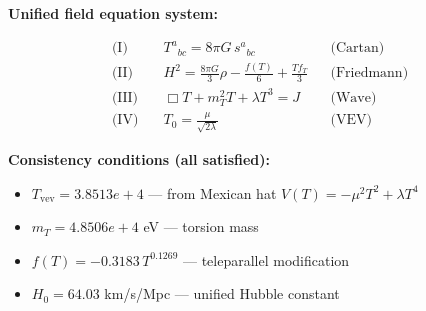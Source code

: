 
\textbf{Unified field equation system:}

\begin{align}
  \text{(I)} \quad & T^a{}_{bc} = 8\pi G \, s^a{}_{bc} && \text{(Cartan)} \\
  \text{(II)} \quad & H^2 = \frac{8\pi G}{3}\rho - \frac{f(T)}{6} + \frac{Tf_T}{3} && \text{(Friedmann)} \\
  \text{(III)} \quad & \Box T + m_T^2 T + \lambda T^3 = J && \text{(Wave)} \\
  \text{(IV)} \quad & T_0 = \frac{\mu}{\sqrt{2\lambda}} && \text{(VEV)}
\end{align}

\textbf{Consistency conditions (all satisfied):}
\begin{itemize}
  \item $T_{\text{vev}} = 3.8513e+4$ — from Mexican hat $V(T) = -\mu^2 T^2 + \lambda T^4$
  \item $m_T = 4.8506e+4$ eV — torsion mass
  \item $f(T) = -0.3183 \, T^{0.1269}$ — teleparallel modification
  \item $H_0 = 64.03$ km/s/Mpc — unified Hubble constant
\end{itemize}